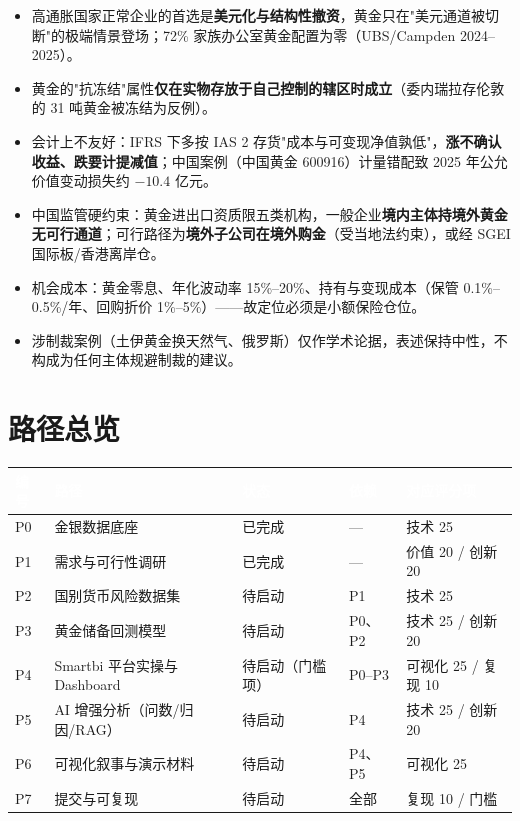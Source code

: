\documentclass[UTF8,12pt]{ctexart}
\begin{document}
\begin{itemize}
\item 高通胀国家正常企业的首选是\textbf{美元化与结构性撤资}，黄金只在"美元通道被切断"的极端情景登场；72\% 家族办公室黄金配置为零（UBS/Campden 2024--2025）。
\item 黄金的"抗冻结"属性\textbf{仅在实物存放于自己控制的辖区时成立}（委内瑞拉存伦敦的 31 吨黄金被冻结为反例）。
\item 会计上不友好：IFRS 下多按 IAS 2 存货"成本与可变现净值孰低"，\textbf{涨不确认收益、跌要计提减值}；中国案例（中国黄金 600916）计量错配致 2025 年公允价值变动损失约 $-10.4$ 亿元。
\item 中国监管硬约束：黄金进出口资质限五类机构，一般企业\textbf{境内主体持境外黄金无可行通道}；可行路径为\textbf{境外子公司在境外购金}（受当地法约束），或经 SGEI 国际板/香港离岸仓。
\item 机会成本：黄金零息、年化波动率 15\%--20\%、持有与变现成本（保管 0.1\%--0.5\%/年、回购折价 1\%--5\%）——故定位必须是小额保险仓位。
\item 涉制裁案例（土伊黄金换天然气、俄罗斯）仅作学术论据，表述保持中性，不构成为任何主体规避制裁的建议。
\end{itemize}

\section{路径总览}

\begin{longtable}{p{1.2cm}p{4.2cm}p{2.0cm}p{3.4cm}p{3.8cm}}
\toprule
\rowcolor{navy}\textcolor{white}{\textbf{编号}} & \textcolor{white}{\textbf{路径}} & \textcolor{white}{\textbf{状态}} & \textcolor{white}{\textbf{依赖}} & \textcolor{white}{\textbf{对应评分项}} \\
\midrule
P0 & 金银数据底座 & 已完成 & --- & 技术 25 \\
P1 & 需求与可行性调研 & 已完成 & --- & 价值 20 / 创新 20 \\
P2 & 国别货币风险数据集 & 待启动 & P1 & 技术 25 \\
P3 & 黄金储备回测模型 & 待启动 & P0、P2 & 技术 25 / 创新 20 \\
P4 & Smartbi 平台实操与 Dashboard & 待启动（门槛项） & P0--P3 & 可视化 25 / 复现 10 \\
P5 & AI 增强分析（问数/归因/RAG） & 待启动 & P4 & 技术 25 / 创新 20 \\
P6 & 可视化叙事与演示材料 & 待启动 & P4、P5 & 可视化 25 \\
P7 & 提交与可复现 & 待启动 & 全部 & 复现 10 / 门槛 \\
\bottomrule
\end{longtable}
\end{document}
